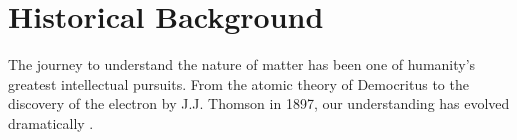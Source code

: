 \section{Historical Background}
\label{sec:INTRODUCTION_HISTORICAL_BACKGROUND}

The journey to understand the nature of matter has been one of humanity's greatest intellectual pursuits. From the atomic theory of Democritus to the discovery of the electron by J.J. Thomson in 1897, our understanding has evolved dramatically \cite{thomson1897}.

